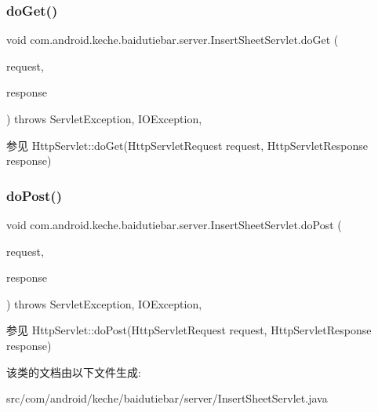 \subsubsection{\texorpdfstring{do\+Get()}{doGet()}}
{\footnotesize\ttfamily void com.\+android.\+keche.\+baidutiebar.\+server.\+Insert\+Sheet\+Servlet.\+do\+Get (\begin{DoxyParamCaption}\item[{Http\+Servlet\+Request}]{request,  }\item[{Http\+Servlet\+Response}]{response }\end{DoxyParamCaption}) throws Servlet\+Exception, I\+O\+Exception\hspace{0.3cm}{\ttfamily [inline]}, {\ttfamily [protected]}}

\begin{DoxySeeAlso}{参见}
Http\+Servlet\+::do\+Get(\+Http\+Servlet\+Request request, Http\+Servlet\+Response response) 
\end{DoxySeeAlso}
\mbox{\label{classcom_1_1android_1_1keche_1_1baidutiebar_1_1server_1_1_insert_sheet_servlet_afda7ec1d201f7ace619c57faa3e36a8e}} 
\subsubsection{\texorpdfstring{do\+Post()}{doPost()}}
{\footnotesize\ttfamily void com.\+android.\+keche.\+baidutiebar.\+server.\+Insert\+Sheet\+Servlet.\+do\+Post (\begin{DoxyParamCaption}\item[{Http\+Servlet\+Request}]{request,  }\item[{Http\+Servlet\+Response}]{response }\end{DoxyParamCaption}) throws Servlet\+Exception, I\+O\+Exception\hspace{0.3cm}{\ttfamily [inline]}, {\ttfamily [protected]}}

\begin{DoxySeeAlso}{参见}
Http\+Servlet\+::do\+Post(\+Http\+Servlet\+Request request, Http\+Servlet\+Response response) 
\end{DoxySeeAlso}


该类的文档由以下文件生成\+:\begin{DoxyCompactItemize}
\item 
src/com/android/keche/baidutiebar/server/Insert\+Sheet\+Servlet.\+java\end{DoxyCompactItemize}
